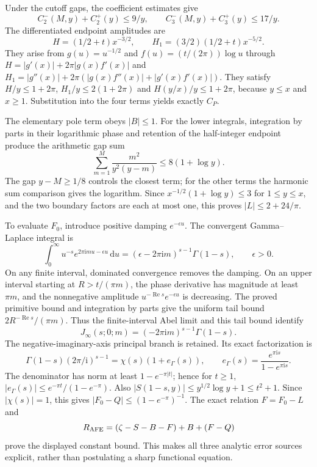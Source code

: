 \documentclass[11pt,a4paper]{article}
\numberwithin{equation}{section}
\theoremstyle{definition}
\newcommand{\dd}{\,\mathrm d}
\newcommand{\ii}{\mathrm i}
\newcommand{\Rea}{\operatorname{Re}}
\begin{document}
Under the cutoff gaps, the coefficient estimates give
\[
 C_2^-(M,y)+C_2^+(y)\le9/y,\qquad
 C_3^-(M,y)+C_3^+(y)\le17/y.
\]
The differentiated endpoint amplitudes are
\[
 H=(1/2+t)x^{-3/2},\qquad H_1=(3/2)(1/2+t)x^{-5/2}.
\]
They arise from $g(u)=u^{-1/2}$ and $f(u)=(t/(2\pi))\log u$ through
$H=|g'(x)|+2\pi|g(x)f'(x)|$ and
$H_1=|g''(x)|+2\pi(|g(x)f''(x)|+|g'(x)f'(x)|)$.
They satisfy
$H/y\le1+2\pi$, $H_1/y\le2(1+2\pi)$ and
$H(y/x)/y\le1+2\pi$, because $y\le x$ and $x\ge1$.
Substitution into the four terms yields exactly $C_P$.

The elementary pole term obeys $|B|\le1$.
For the lower integrals, integration by parts in their logarithmic phase and
retention of the half-integer endpoint produce the arithmetic gap sum
\[
 \sum_{m=1}^M\frac{m^2}{y^2(y-m)}\le8(1+\log y).
\]
The gap $y-M\ge1/8$ controls the closest term; for the other terms the
harmonic sum comparison gives the logarithm. Since
$x^{-1/2}(1+\log y)\le3$ for $1\le y\le x$, and the two boundary factors
are each at most one, this proves $|L|\le2+24/\pi$.

To evaluate $F_0$, introduce positive damping $e^{-\epsilon u}$.
The convergent Gamma--Laplace integral is
\[
 \int_0^\infty u^{-s}e^{2\pi\ii mu-\epsilon u}\dd u
   =(\epsilon-2\pi\ii m)^{s-1}\Gamma(1-s),\qquad\epsilon>0.
\]
On any finite interval, dominated convergence removes the damping. On an upper
interval starting at $R>t/(\pi m)$, the phase derivative has magnitude at
least $\pi m$, and the nonnegative amplitude $u^{-\Rea s}e^{-\epsilon u}$
is decreasing. The proved primitive bound and integration by parts give the
uniform tail bound $2R^{-\Rea s}/(\pi m)$. Thus the finite-interval Abel
limit and this tail bound identify
\[
 J_\infty(s;0;m)=(-2\pi\ii m)^{s-1}\Gamma(1-s).
\]
The negative-imaginary-axis principal branch is retained. Its exact factorization
is
\[
 \Gamma(1-s)(2\pi/\ii)^{s-1}
       =\chi(s)(1+e_\Gamma(s)),\qquad
 e_\Gamma(s)=\frac{e^{\pi\ii s}}{1-e^{\pi\ii s}}.
\]
The denominator has norm at least $1-e^{-\pi|t|}$; hence for $t\ge1$,
$|e_\Gamma(s)|\le e^{-\pi t}/(1-e^{-\pi})$.
Also $|S(1-s,y)|\le y^{1/2}\log y+1\le t^2+1$.
Since $|\chi(s)|=1$, this gives $|F_0-Q|\le(1-e^{-\pi})^{-1}$.
The exact relation $F=F_0-L$ and
\[
 R_{\rm AFE}=(\zeta-S-B-F)+B+(F-Q)
\]
prove the displayed constant bound. This makes all three analytic error sources
explicit, rather than postulating a sharp functional equation.
\end{document}
